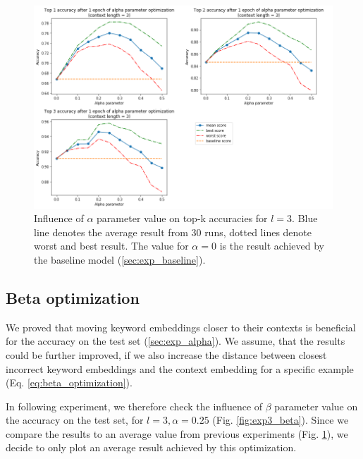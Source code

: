\documentclass{llncs}
\begin{document}
\begin{figure}
    \centering
    \caption{Influence of \(\alpha\) parameter value on top-k accuracies for \(l=3\). Blue line denotes the average result from 30 runs, dotted lines denote worst and best result. The value for \(\alpha=0\) is the result achieved by the baseline model (\ref{sec:exp_baseline}).}
    \label{fig:exp2_alpha}
    \includegraphics[scale=0.65]{res/exp2_alpha_top_acc.png}
\end{figure}

\subsection{Beta optimization}
\label{sec:exp_beta}
We proved that moving keyword embeddings closer to their contexts is beneficial for the accuracy on the test set (\ref{sec:exp_alpha}).
We assume, that the results could be further improved, if we also increase the distance between closest incorrect keyword embeddings and the context embedding for a specific example (Eq. \ref{eq:beta_optimization}).

In following experiment, we therefore check the influence of \(\beta\) parameter value on the accuracy on the test set, for \(l=3, \alpha=0.25\) (Fig. \ref{fig:exp3_beta}).
Since we compare the results to an average value from previous experiments (Fig. \ref{fig:exp2_alpha}), we decide to only plot an average result achieved by this optimization.
\end{document}
